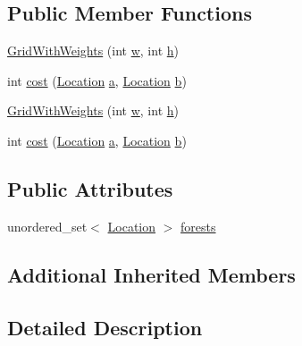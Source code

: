 \subsection*{Public Member Functions}
\begin{DoxyCompactItemize}
\item 
\mbox{\hyperlink{struct_grid_with_weights_ad9eb67bf93deb3409ecf658288bc78f6}{Grid\+With\+Weights}} (int \mbox{\hyperlink{glad_8h_a713abae75276598501f75c68917c5e2d}{w}}, int \mbox{\hyperlink{glad_8h_afa0fb1b5e976920c0abeff2dca3ed774}{h}})
\item 
int \mbox{\hyperlink{struct_grid_with_weights_a999c39922a9b507e4436b817592a7ff9}{cost}} (\mbox{\hyperlink{struct_square_grid_a2c9a2cbd3912aa48ac97289abc3f1c0f}{Location}} \mbox{\hyperlink{glad_8h_a3309789fc188587d666cda5ece79cf82}{a}}, \mbox{\hyperlink{struct_square_grid_a2c9a2cbd3912aa48ac97289abc3f1c0f}{Location}} \mbox{\hyperlink{glad_8h_a0f71581a41fd2264c8944126dabbd010}{b}})
\item 
\mbox{\hyperlink{struct_grid_with_weights_ad9eb67bf93deb3409ecf658288bc78f6}{Grid\+With\+Weights}} (int \mbox{\hyperlink{glad_8h_a713abae75276598501f75c68917c5e2d}{w}}, int \mbox{\hyperlink{glad_8h_afa0fb1b5e976920c0abeff2dca3ed774}{h}})
\item 
int \mbox{\hyperlink{struct_grid_with_weights_a999c39922a9b507e4436b817592a7ff9}{cost}} (\mbox{\hyperlink{struct_square_grid_a2c9a2cbd3912aa48ac97289abc3f1c0f}{Location}} \mbox{\hyperlink{glad_8h_a3309789fc188587d666cda5ece79cf82}{a}}, \mbox{\hyperlink{struct_square_grid_a2c9a2cbd3912aa48ac97289abc3f1c0f}{Location}} \mbox{\hyperlink{glad_8h_a0f71581a41fd2264c8944126dabbd010}{b}})
\end{DoxyCompactItemize}
\subsection*{Public Attributes}
\begin{DoxyCompactItemize}
\item 
unordered\+\_\+set$<$ \mbox{\hyperlink{struct_square_grid_a2c9a2cbd3912aa48ac97289abc3f1c0f}{Location}} $>$ \mbox{\hyperlink{struct_grid_with_weights_a03137c824b8c63cdeed414ef40f5b504}{forests}}
\end{DoxyCompactItemize}
\subsection*{Additional Inherited Members}


\subsection{Detailed Description}


